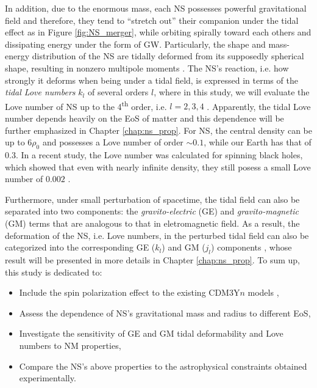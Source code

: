 In addition, due to the enormous mass, each \gls{NS} possesses powerful gravitational field and therefore, they tend to ``stretch out'' their companion under the tidal effect as in Figure \ref{fig:NS_merger}, while orbiting spirally toward each others and dissipating energy under the form of \gls{GW}. Particularly, the shape and mass-energy distribution of the \gls{NS} are tidally deformed from its supposedly spherical shape, resulting in nonzero multipole moments \citep{hinderer2008tidal,hinderer2010tidal,damour2009relativistic}. The \gls{NS}'s reaction, i.e. how strongly it deforms when being under a tidal field, is expressed in terms of the \emph{tidal Love numbers} $k_l$ of several orders $l$, where in this study, we will evaluate the Love number of \gls{NS} up to the 4\textsuperscript{th} order, i.e. $l=2,3,4$ \citep{perot2021role}. Apparently, the tidal Love number depends heavily on the \gls{EoS} of matter and this dependence will be further emphasized in Chapter \ref{chap:ns_prop}. For \gls{NS}, the central density can be up to $6\rho_0$ and possesses a Love number of order $\sim 0.1$, while our Earth has that of $0.3$. In a recent study, the Love number was calculated for spinning black holes, which showed that even with nearly infinite density, they still posess a small Love number of $0.002$ \citep{le2021spinning}.\par
Furthermore, under small perturbation of spacetime, the tidal field can also be separated into two components: the \emph{gravito-electric} (\gls{GE}) and \emph{gravito-magnetic} (\gls{GM}) terms \citep{damour2009relativistic} that are analogous to that in eletromagnetic field. As a result, the deformation of the \gls{NS}, i.e. Love numbers, in the perturbed tidal field can also be categorized into the corresponding \gls{GE} ($k_l$) and \gls{GM} ($j_l$) components \citep{perot2021role}, whose result will be presented in more details in Chapter \ref{chap:ns_prop}. To sum up, this study is dedicated to:
\begin{itemize}
        \item Include the spin polarization effect to the existing CDM3Y$n$ models \citep{tan2021equation},
        \item Assess the dependence of \gls{NS}'s gravitational mass and radius to different \gls{EoS},
        \item Investigate the sensitivity of \gls{GE} and \gls{GM} tidal deformability and Love numbers to \gls{NM} properties,
        \item Compare the \gls{NS}'s above properties to the astrophysical constraints obtained experimentally.
\end{itemize}
